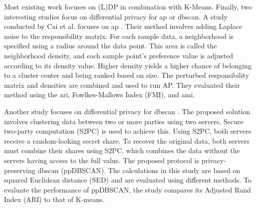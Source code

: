 Most existing work focuses on (L)DP in combination with K-Means.
Finally, two interesting studies focus on differential privacy for \gls{ap} or \gls{dbscan}.
A study conducted by Cai et al. focuses on \gls{ap} \citep{cai_dp-ap_2020}.
Their method involves adding Laplace noise to the responsibility matrix.
For each sample data, a neighborhood is specified using a radius around the data point.
This area is called the neighborhood density, and each sample point’s preference value is adjusted according to its density value.
Higher density yields a higher chance of belonging to a cluster center and being ranked based on size.
The perturbed responsibility matrix and densities are combined and used to run AP.
They evaluated their method using the  \gls{ari}, Fowlkes-Mallows Index (FMI), and \gls{ami}.

Another study focuses on differential privacy for \gls{dbscan} \citep{bozdemir_privacy-preserving_nodate}.
The proposed solution involves clustering data between two or more parties using two servers.
Secure two-party computation (S2PC) is used to achieve this.
Using S2PC, both servers receive a random-looking secret share.
To recover the original data, both servers must combine their shares using S2PC, which combines the data without the servers having access to the full value.
The proposed protocol is privacy-preserving \gls{dbscan} (ppDBSCAN).
The calculations in this study are based on squared Euclidean distance (SED) and are evaluated using different methods.
To evaluate the performance of ppDBSCAN, the study compares its Adjusted Rand Index (ARI) to that of K-means.
